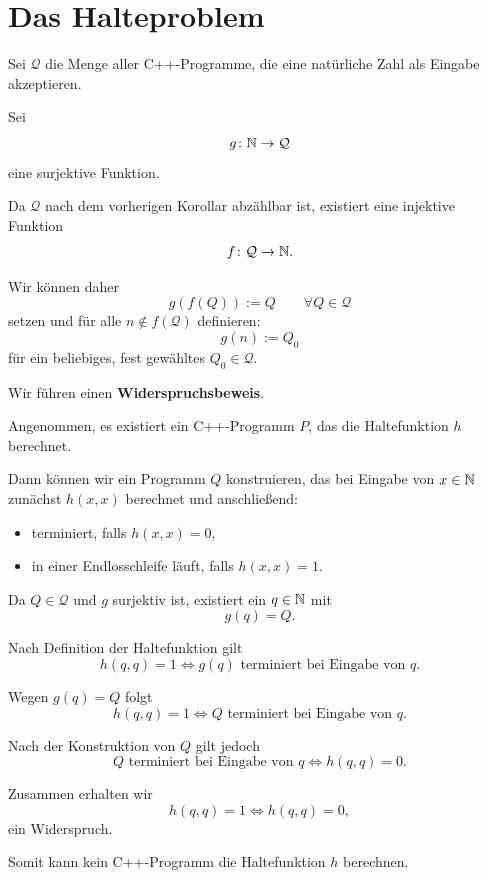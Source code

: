 \section{Das Halteproblem}

Sei $\mathcal Q$ die Menge aller C++-Programme, die eine
natürliche Zahl als Eingabe akzeptieren.

Sei
\[
  g\colon\mathbb{N}\to\mathcal Q
\]
eine surjektive Funktion.

Da $\mathcal Q$ nach dem vorherigen Korollar abzählbar ist,
existiert eine injektive Funktion
\[
  f\colon\mathcal Q\to\mathbb{N}.
\]

Wir können daher
\[
  g(f(Q)):=Q
  \qquad\forall Q\in\mathcal Q
\]
setzen und für alle $n\notin f(\mathcal Q)$ definieren:
\[
  g(n):=Q_0
\]
für ein beliebiges, fest gewähltes $Q_0\in\mathcal Q$.



\begin{myproof}
  Wir führen einen \textbf{Widerspruchsbeweis}.

  Angenommen, es existiert ein C++-Programm $P$,
  das die Haltefunktion $h$ berechnet.

  Dann können wir ein Programm $Q$ konstruieren,
  das bei Eingabe von $x\in\mathbb{N}$ zunächst
  $h(x,x)$ berechnet und anschließend:
  \begin{itemize}
    \item terminiert, falls $h(x,x)=0$,
    \item in einer Endlosschleife läuft, falls $h(x,x)=1$.
  \end{itemize}

  Da $Q\in\mathcal Q$ und $g$ surjektiv ist,
  existiert ein $q\in\mathbb{N}$ mit
  \[
    g(q)=Q.
  \]

  Nach Definition der Haltefunktion gilt
  \[
    h(q,q)=1
    \iff
    g(q)\text{ terminiert bei Eingabe von }q.
  \]

  Wegen $g(q)=Q$ folgt
  \[
    h(q,q)=1
    \iff
    Q\text{ terminiert bei Eingabe von }q.
  \]

  Nach der Konstruktion von $Q$ gilt jedoch
  \[
    Q\text{ terminiert bei Eingabe von }q
    \iff h(q,q)=0.
  \]

  Zusammen erhalten wir
  \[
    \boxed{h(q,q)=1\iff h(q,q)=0,}
  \]
  ein Widerspruch.

  Somit kann kein C++-Programm die Haltefunktion
  $h$ berechnen.
\end{myproof}

